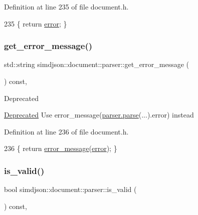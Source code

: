 Definition at line 235 of file document.\+h.


\begin{DoxyCode}
235 \{ \textcolor{keywordflow}{return} \hyperlink{classsimdjson_1_1document_1_1parser_afa18e48f1df491d56afdfea2fa353e05}{error}; \}
\end{DoxyCode}
\mbox{\label{classsimdjson_1_1document_1_1parser_ab971378e4a9496980632c2cbed66e992}} 
\subsubsection{\texorpdfstring{get\+\_\+error\+\_\+message()}{get\_error\_message()}}
{\footnotesize\ttfamily std\+::string simdjson\+::document\+::parser\+::get\+\_\+error\+\_\+message (\begin{DoxyParamCaption}{ }\end{DoxyParamCaption}) const\hspace{0.3cm}{\ttfamily [inline]}, {\ttfamily [noexcept]}}

\begin{DoxyRefDesc}{Deprecated}
\item[\hyperlink{deprecated__deprecated000008}{Deprecated}]Use {\ttfamily error\+\_\+message(\hyperlink{classsimdjson_1_1document_1_1parser_a3eb1fd46ea0dad62eceed4b1c302b7ad}{parser.\+parse}(...).error)} instead \end{DoxyRefDesc}


Definition at line 236 of file document.\+h.


\begin{DoxyCode}
236 \{ \textcolor{keywordflow}{return} \hyperlink{namespacesimdjson_a4872e460818b01f93d883d184cd0009e}{error\_message}(\hyperlink{classsimdjson_1_1document_1_1parser_afa18e48f1df491d56afdfea2fa353e05}{error}); \}
\end{DoxyCode}
\mbox{\label{classsimdjson_1_1document_1_1parser_af8bc0c415446f61d6be1a2e3f60a13ad}} 
\subsubsection{\texorpdfstring{is\+\_\+valid()}{is\_valid()}}
{\footnotesize\ttfamily bool simdjson\+::document\+::parser\+::is\+\_\+valid (\begin{DoxyParamCaption}{ }\end{DoxyParamCaption}) const\hspace{0.3cm}{\ttfamily [inline]}, {\ttfamily [noexcept]}}

